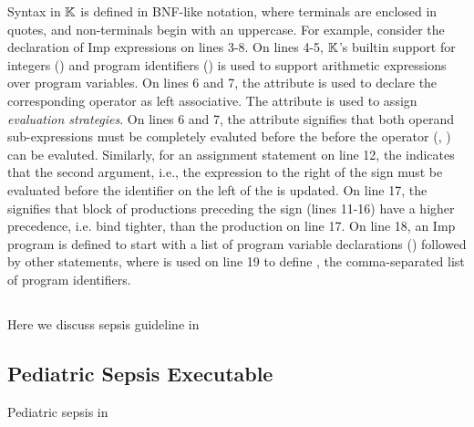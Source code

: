 Syntax in $\mathbb{K}{}$ is defined in BNF-like notation, where terminals are enclosed
in quotes, and non-terminals begin with an uppercase. For example,
consider the declaration of Imp expressions on lines 3-8. On lines 4-5,
$\mathbb{K}$'s builtin support for integers () and program identifiers
() is used to support arithmetic expressions over program variables.
On lines 6 and 7, the attribute  is used to declare the
corresponding operator as left associative. The  attribute is used
to assign \emph{evaluation strategies}. On lines 6 and 7, the attribute
signifies that both operand sub-expressions must be completely evaluted before the
before the operator (\inlinek{+}, \inlinek{-}) can be evaluted. Similarly, for
an assignment statement on line 12,
the  indicates that the second argument, i.e., the
expression to the right of the \inlineimp{=} sign must be evaluated before
the identifier on the left of the \inlineimp{=} is updated. On line 17,
the \inlinek{>} signifies that block of  productions preceding
the sign (lines 11-16) have a higher precedence, i.e. bind tighter,
than the production on line 17.
On line 18, an Imp program is defined to start with a list of program variable
declarations () followed by other statements, where
  is used on line 19 to define , the comma-separated list of
program identifiers.



\subsection{\MediK{}}\label{subsec:medik}
Here we discuss sepsis guideline in \MediK{}


\subsection{Pediatric Sepsis Executable \BPG{}}\label{subsec:sepsis-cdss}
Pediatric sepsis \CDSS{} in \MediK{}


